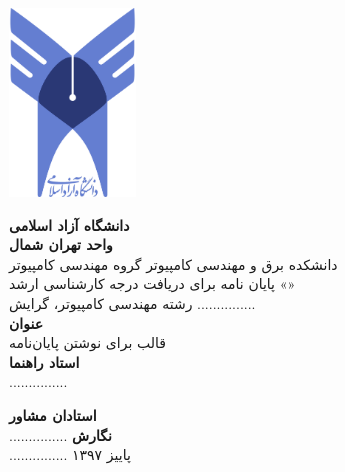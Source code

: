 \thispagestyle{empty}

\centerline{\includegraphics[height=5cm]{figs/logo.png}}

\begin{center}
\vspace{0.5cm}

\textbf{دانشگاه آزاد اسلامی}
\\[.2cm]
\textbf{واحد تهران شمال}
\\[0.5cm]

دانشکده برق و مهندسی کامپیوتر گروه مهندسی کامپیوتر
\\[.5cm]
پایان نامه برای دریافت درجه کارشناسی ارشد «»
\\[.2cm]
رشته مهندسی کامپیوتر، گرایش ...............
\\[0.5cm]

{\Large
\textbf{عنوان}
}
\\
قالب  برای نوشتن پایان‌نامه
\\[0.5cm]

{\Large
	\textbf{استاد راهنما}
}
\\
...............
\vskip 0.5cm

{\Large
	\textbf{استادان مشاور}
}
\\
...............
\vskip 0.5cm
{\Large
	\textbf{نگارش}
}
\\
...............
\vskip 0.5cm
پاییز ۱۳۹۷
\end{center}